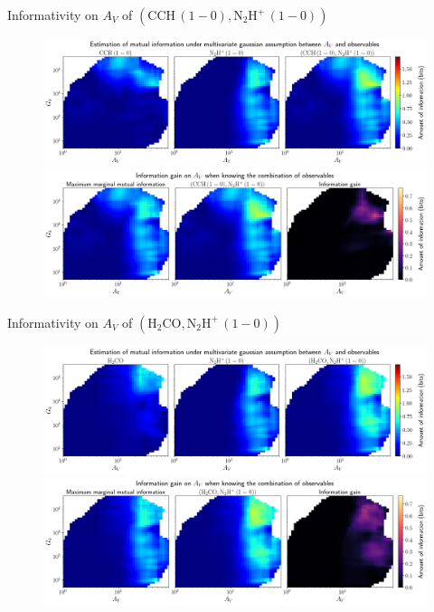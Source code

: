 \documentclass{beamer}
\begin{document}
\begin{frame}{Informativity on $A_V$ of $\left(\mathrm{CCH\,(1-0)},\mathrm{N_2H^+\,(1-0)}\right)$}
    \begin{figure}
        \centering
        \includegraphics[width=0.95\linewidth]{../linearinfo/av__cch10_n2hp10_linearinfo.png}
        \vfill
        \includegraphics[width=0.95\linewidth]{../linearinfo/av__cch10_n2hp10_linearinfo_gain.png}
    \end{figure}
\end{frame}

\begin{frame}{Informativity on $A_V$ of $\left(\mathrm{H_2CO},\mathrm{N_2H^+\,(1-0)}\right)$}
    \begin{figure}
        \centering
        \includegraphics[width=0.95\linewidth]{../linearinfo/av__h2co_n2hp10_linearinfo.png}
        \vfill
        \includegraphics[width=0.95\linewidth]{../linearinfo/av__h2co_n2hp10_linearinfo_gain.png}
    \end{figure}
\end{frame}
\end{document}
